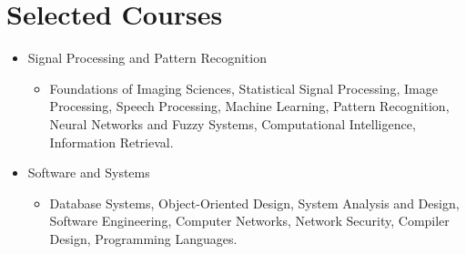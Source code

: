 \documentclass[a4paper]{article}
\theoremstyle{definition}
\begin{document}
\section{Selected Courses}
\begin{itemize}
	
	\item{Signal Processing and Pattern Recognition}
		\begin{itemize}
			\item Foundations of Imaging Sciences, Statistical Signal Processing, Image Processing, Speech Processing,  Machine Learning, Pattern Recognition,  Neural Networks and Fuzzy Systems, Computational Intelligence, Information Retrieval.
			
		\end{itemize}
	
	\item{Software and Systems}
		\begin{itemize}
			\item Database Systems, Object-Oriented Design, System Analysis and Design, Software Engineering, Computer Networks, Network Security, Compiler Design, Programming Languages.
			
			
		\end{itemize}
	
\end{itemize}
 
\end{document}
